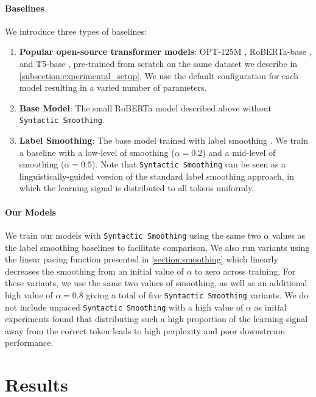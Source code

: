 \paragraph{Baselines}

We introduce three types of baselines: 
\begin{enumerate}
    \item \textbf{Popular open-source transformer models}: OPT-125M \citep{zhang2022opt}, RoBERTa-base \citep{liu2019roberta}, and T5-base \citep{raffel2020t5}, pre-trained from scratch on the same dataset we describe in \cref{subsection:experimental_setup}. We use the default configuration for each model resulting in a varied number of parameters.
    \item \textbf{Base Model}: The small RoBERTa model described above without \texttt{Syntactic Smoothing}.
    \item \textbf{Label Smoothing}: The base model trained with label smoothing \citep{szegedy2016rethinking}.  We train a baseline with a low-level of smoothing ($\alpha=0.2$) and a mid-level of smoothing ($\alpha=0.5$). Note that \texttt{Syntactic Smoothing} can be seen as a linguistically-guided version of the standard label smoothing approach, in which the learning signal is distributed to all tokens uniformly.
\end{enumerate}


\paragraph{Our Models} We train our models with \texttt{Syntactic Smoothing} using the same two $\alpha$ values as the label smoothing baselines to facilitate comparison. We also run variants using the linear pacing function presented in \cref{section:smoothing} which linearly decreases the smoothing from an initial value of $\alpha$ to zero across training. For these variants, we use the same two values of smoothing, as well as an additional high value of $\alpha=0.8$ giving a total of five \texttt{Syntactic Smoothing} variants. We do not include unpaced \texttt{Syntactic Smoothing} with a high value of $\alpha$ as initial experiments found that distributing such a high proportion of the learning signal away from the correct token leads to high perplexity and poor downstream performance.

\section{Results}
\label{sec:results}

